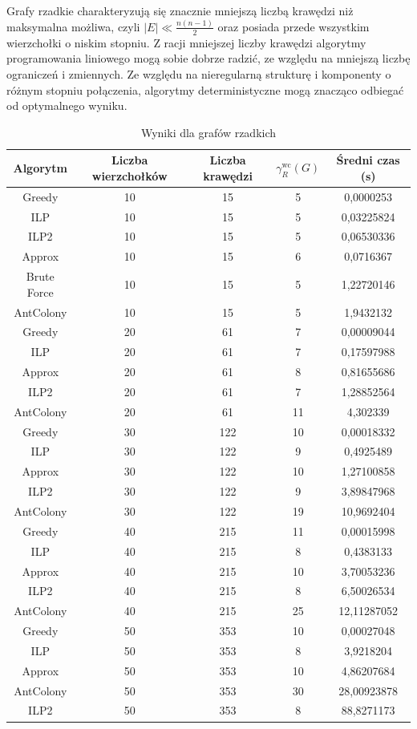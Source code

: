 Grafy rzadkie charakteryzują się znacznie mniejszą liczbą krawędzi niż maksymalna możliwa, czyli $|E| \ll \frac{n(n - 1)}{2}$ oraz posiada przede wszystkim wierzchołki o niskim stopniu. Z racji mniejszej liczby krawędzi algorytmy programowania liniowego mogą sobie dobrze radzić, ze względu na mniejszą liczbę ograniczeń i zmiennych. Ze względu na nieregularną strukturę i komponenty o różnym stopniu połączenia, algorytmy deterministyczne mogą znacząco odbiegać od optymalnego wyniku.

\begin{table}[H]
    \centering
    \begin{tabular}{|c|c|c|c|c|}
    \hline
    Algorytm & Liczba wierzchołków & Liczba krawędzi & $\gamma^{\text{wc}}_R(G)$ & Średni czas (s) \\
    \hline
    Greedy	   & 10 &	15 &	5	 &   0,0000253	\\		
    ILP	       & 10 &	15 &	5	  &   0,03225824 \\
    ILP2	   & 10 &	15 &	5	  &   0,06530336 \\
    Approx	   & 10 &	15 &	6	  &   0,0716367 \\
    Brute Force & 10 &	15 &	5 	 &   1,22720146 \\
    AntColony & 10 &	15 &	5 	 &   1,9432132 \\
    \hline
    Greedy     &  20 & 61 & 7    &  0,00009044 \\     
    ILP        &  20 & 61 & 7    &   0,17597988 \\
    Approx     &  20 & 61 & 8    &    0,81655686 \\   
    ILP2       &  20 & 61 & 7    &   1,28852564 \\    
    AntColony  &  20 & 61 & 11   &   4,302339 \\         
    \hline
    Greedy & 30 & 122 & 10 & 0,00018332 \\
    ILP & 30 & 122 & 9 & 0,4925489 \\
    Approx & 30 & 122 & 10 & 1,27100858 \\
    ILP2 & 30 & 122 & 9 & 3,89847968 \\
    AntColony & 30 & 122 & 19 & 10,9692404 \\
    \hline
    Greedy & 40 & 215 & 11 & 0,00015998 \\
    ILP & 40 & 215 & 8 & 0,4383133 \\
    Approx & 40 & 215 & 10 & 3,70053236 \\
    ILP2 & 40 & 215 & 8 & 6,50026534 \\
    AntColony & 40 & 215 & 25 & 12,11287052 \\
    \hline
    Greedy & 50 & 353 & 10 & 0,00027048 \\
    ILP & 50 & 353 & 8 & 3,9218204 \\
    Approx & 50 & 353 & 10 & 4,86207684 \\
    AntColony & 50 & 353 & 30 & 28,00923878 \\
    ILP2 & 50 & 353 & 8 & 88,8271173 \\   
    \hline
    \end{tabular}
    \caption{Wyniki dla grafów rzadkich}
    \end{table}

